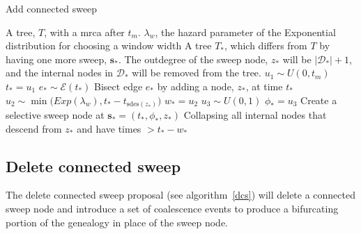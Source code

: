\documentclass[letterpaper]{article}
\newcommand{\sweep}[1]{{\ensuremath{\mathbf{s}_{#1}}}}
\newcommand{\sweeptime}[1]{{\ensuremath{t_{#1}}}}
\newcommand{\sweepfreq}[1]{{\ensuremath{\phi_{#1}}}}
\newcommand{\sweeploc}[1]{{\ensuremath{z_{#1}}}}
\newcommand{\edgesAt}{{\ensuremath{\mathcal{E}}}}
\begin{document}
\begin{algorithm} 
\caption{Add connected sweep}
\label{acs}
\begin{algorithmic}[1]
	\REQUIRE A tree, $T$, with a mrca after $t_m$.
	\REQUIRE $\lambda_w$, the  hazard parameter of the Exponential distribution for choosing a window width
	\ENSURE A tree $T_{*}$, which differs from $T$ by having one more sweep, $\sweep{*}$. The outdegree of the sweep node, $\sweeploc{*}$ will be $|\mathcal{D}_{*}| + 1$, and the internal nodes in $\mathcal{D}_{*}$ will be removed from the tree.
	\STATE $u_1 \sim U(0, t_m)$
	\STATE $\sweeptime{*} = u_1$
	\STATE $e_{*} \sim \edgesAt(\sweeptime{*})$
	\STATE Bisect edge $e_*$ by adding a node, $z_*$, at time $\sweeptime{*}$
	\STATE $u_2 \sim \min\Big(Exp(\lambda_w), \sweeptime{*} - \sweeptime{\mbox{sdes}(z_{*})}\Big)$
	\STATE $w_{*} = u_2$
	\STATE $u_3 \sim U(0,1)$
	\STATE $\sweepfreq{*} = u_3$
	\STATE Create a selective sweep node at $\sweep{*} =(\sweeptime{*},\sweepfreq{*}, z_{*})$
	\STATE Collapsing all internal nodes that  descend from $z_*$ and have times $>\sweeptime{*}-w_*$
\end{algorithmic}
\end{algorithm} 

\subsection{Delete connected sweep}
The delete connected sweep proposal (see algorithm~\ref{dcs}) will delete a connected sweep node and introduce a set of coalescence events to produce a bifurcating portion of the genealogy in place of the sweep node.
\end{document}
